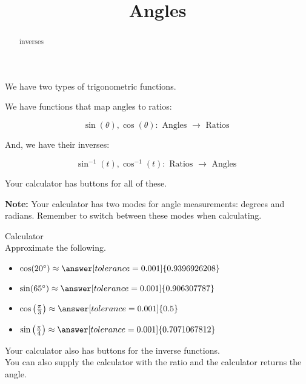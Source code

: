 \documentclass{ximera}
\title{Angles}
\begin{document}
\begin{abstract}
inverses
\end{abstract}
\maketitle




We have two types of trigonometric functions.


We have functions that map angles to ratios:


\[
\sin(\theta), \cos(\theta) :  \text{ Angles } \to \text{ Ratios }
\]


And, we have their inverses:



\[
\sin^{-1}(t), \cos^{-1}(t) :  \text{ Ratios } \to \text{ Angles }
\]








Your calculator has buttons for all of these.


\textbf{Note:}  Your calculator has two modes for angle measurements: degrees and radians.  Remember to switch between these modes when calculating.



\begin{question} Calculator \\

Approximate the following.

\begin{itemize}
\item $\cos(20^{\circ}) \approx \answer[tolerance=0.001]{0.9396926208}$
\item $\sin(65^{\circ}) \approx \answer[tolerance=0.001]{0.906307787}$
\item $\cos\left( \frac{\pi}{3} \right) \approx \answer[tolerance=0.001]{0.5}$
\item $\sin\left( \frac{\pi}{4} \right) \approx \answer[tolerance=0.001]{0.7071067812}$
\end{itemize}

\end{question}





Your calculator also has buttons for the inverse functions. \\




You can also supply the calculator with the ratio and the calculator returns the angle.
\end{document}

